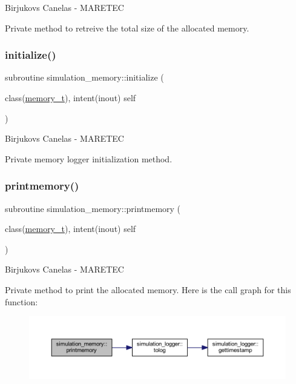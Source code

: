 Birjukovs Canelas -\/ M\+A\+R\+E\+T\+EC 

Private method to retreive the total size of the allocated memory. \mbox{\label{namespacesimulation__memory_a3b8f4e0766c90e6d6bd99e2fa49ea91b}} 
\subsubsection{\texorpdfstring{initialize()}{initialize()}}
{\footnotesize\ttfamily subroutine simulation\+\_\+memory\+::initialize (\begin{DoxyParamCaption}\item[{class(\mbox{\hyperlink{structsimulation__memory_1_1memory__t}{memory\+\_\+t}}), intent(inout)}]{self }\end{DoxyParamCaption})\hspace{0.3cm}{\ttfamily [private]}}



Birjukovs Canelas -\/ M\+A\+R\+E\+T\+EC 

Private memory logger initialization method. \mbox{\label{namespacesimulation__memory_a5827bef8479b809a453af147ceaa8c7c}} 
\subsubsection{\texorpdfstring{printmemory()}{printmemory()}}
{\footnotesize\ttfamily subroutine simulation\+\_\+memory\+::printmemory (\begin{DoxyParamCaption}\item[{class(\mbox{\hyperlink{structsimulation__memory_1_1memory__t}{memory\+\_\+t}}), intent(inout)}]{self }\end{DoxyParamCaption})\hspace{0.3cm}{\ttfamily [private]}}



Birjukovs Canelas -\/ M\+A\+R\+E\+T\+EC 

Private method to print the allocated memory. Here is the call graph for this function\+:\nopagebreak
\begin{figure}[H]
\begin{center}
\leavevmode
\includegraphics[width=350pt]{namespacesimulation__memory_a5827bef8479b809a453af147ceaa8c7c_cgraph}
\end{center}
\end{figure}


